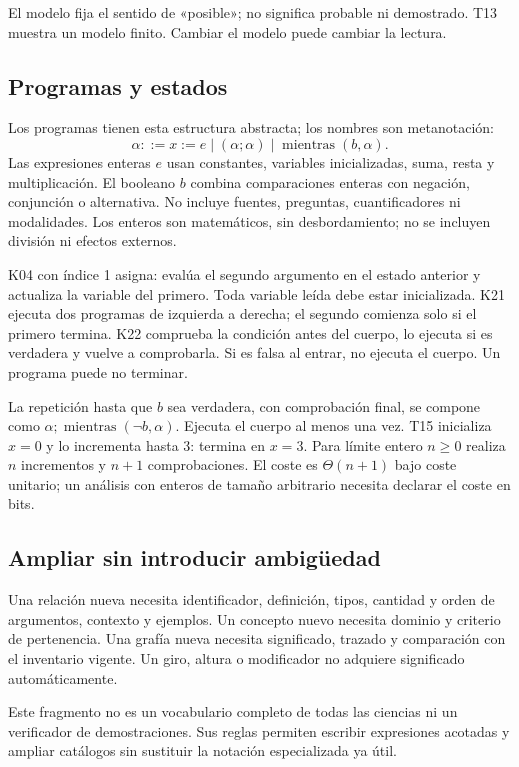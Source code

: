 El modelo fija el sentido de «posible»; no significa probable ni demostrado.
T13 muestra un modelo finito. Cambiar el modelo puede cambiar la lectura.

\subsection{Programas y estados}
Los programas tienen esta estructura abstracta; los nombres son metanotación:
\[
\alpha ::= x:=e\mid(\alpha;\alpha)\mid\operatorname{mientras}(b,\alpha).
\]
Las expresiones enteras \(e\) usan constantes, variables inicializadas, suma,
resta y multiplicación. El booleano \(b\) combina comparaciones enteras con
negación, conjunción o alternativa. No incluye fuentes, preguntas,
cuantificadores ni modalidades. Los enteros son matemáticos, sin desbordamiento;
no se incluyen división ni efectos externos.

K04 con índice 1 asigna: evalúa el segundo argumento en el estado anterior y
actualiza la variable del primero. Toda variable leída debe estar inicializada.
K21 ejecuta dos programas de izquierda a derecha; el segundo comienza solo si
el primero termina. K22 comprueba la condición antes del cuerpo, lo ejecuta
si es verdadera y vuelve a comprobarla. Si es falsa al entrar, no ejecuta el
cuerpo. Un programa puede no terminar.

La repetición hasta que \(b\) sea verdadera, con comprobación final, se compone
como \(\alpha;\operatorname{mientras}(\neg b,\alpha)\). Ejecuta el cuerpo
al menos una vez. T15 inicializa \(x=0\) y lo incrementa hasta 3: termina en
\(x=3\). Para límite entero \(n\geq0\) realiza \(n\) incrementos y \(n+1\)
comprobaciones. El coste es \(\Theta(n+1)\) bajo coste unitario; un análisis
con enteros de tamaño arbitrario necesita declarar el coste en bits.

\subsection{Ampliar sin introducir ambigüedad}
Una relación nueva necesita identificador, definición, tipos, cantidad y orden
de argumentos, contexto y ejemplos. Un concepto nuevo necesita dominio y
criterio de pertenencia. Una grafía nueva necesita significado, trazado y
comparación con el inventario vigente. Un giro, altura o modificador no adquiere
significado automáticamente.

Este fragmento no es un vocabulario completo de todas las ciencias ni un
verificador de demostraciones. Sus reglas permiten escribir expresiones
acotadas y ampliar catálogos sin sustituir la notación especializada ya útil.

